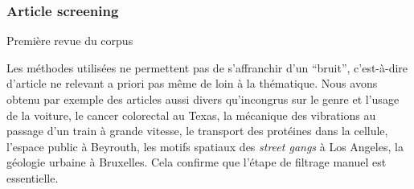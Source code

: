 

\subsubsection{Article screening}{Première revue du corpus}

Les méthodes utilisées ne permettent pas de s'affranchir d'un ``bruit'', c'est-à-dire d'article ne relevant a priori pas même de loin à la thématique. Nous avons obtenu par exemple des articles aussi divers qu'incongrus sur le genre et l'usage de la voiture, le cancer colorectal au Texas, la mécanique des vibrations au passage d'un train à grande vitesse, le transport des protéines dans la cellule, l'espace public à Beyrouth, les motifs spatiaux des \emph{street gangs} à Los Angeles, la géologie urbaine à Bruxelles. Cela confirme que l'étape de filtrage manuel est essentielle.

